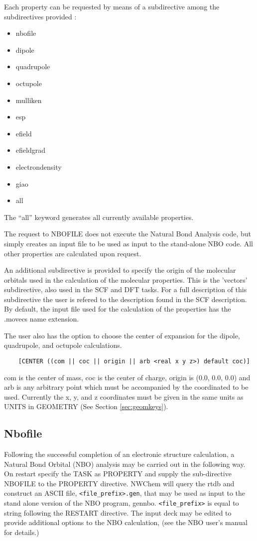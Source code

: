 Each property can be requested by means of a subdirective among the
subdirectives provided :

\begin{itemize}
\item nbofile
\item dipole
\item quadrupole
\item octupole
\item mulliken
\item esp
\item efield
\item efieldgrad
\item electrondensity
\item giao 
\item all 
\end{itemize}

The ``all'' keyword generates all currently available properties. 

The request to NBOFILE does not execute the Natural Bond Analysis
code, but simply creates an input file to be used as input to the
stand-alone NBO code. All other properties are calculated upon
request.

An additional subdirective is provided to specify the origin of the
molecular orbitals used in the calculation of the molecular
properties. This is the 'vectors' subdirective, also used in the
SCF and DFT tasks. For a full description of this subdirective
the user is refered to the description found in the SCF description.
By default, the input file used for the calculation of the properties
has the .movecs name extension. 

The user also has the option to choose the center of expansion for
the dipole, quadrupole, and octupole calculations.

\begin{verbatim}
    [CENTER ((com || coc || origin || arb <real x y z>) default coc)]
\end{verbatim}

com is the center of mass, coc is the center of charge, origin is 
(0.0, 0.0, 0.0) and arb is any arbitrary point which must be accompanied
by the coordinated to be used.  Currently the x, y, and z coordinates
must be given in the same units as UNITS in GEOMETRY (See Section
\ref{sec:geomkeys}).

\subsection{Nbofile}

Following the successful completion of an electronic structure
calculation, a Natural Bond Orbital (NBO) analysis may be carried out
in the following way.  On restart specify the TASK as PROPERTY and
supply the sub-directive NBOFILE to the PROPERTY directive.  NWChem
will query the rtdb and construct an ASCII file,
\verb+<file_prefix>.gen+, that may be used as input to the stand alone
version of the NBO program, gennbo.  \verb+<file_prefix>+ is equal to
string following the RESTART directive.  The input deck may be edited
to provide additional options to the NBO calculation, (see the NBO
user's manual for details.)

